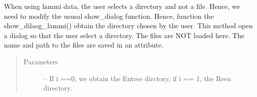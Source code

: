 \documentclass[letterpaper,10pt,english]{sphinxmanual}
\begin{document}
\begin{fulllineitems}
\begin{fulllineitems}
\label{\detokenize{index:src_GUI.hydro_GUI_2.LAMMI.show_dialog_lammi}}
When using lammi data, the user selects a directory and not a file. Hence, we need to modify the ususal
show\_dialog function. Hence, function the show\_dilaog\_lammi() obtain the directory chosen by the user.
This method open a dialog so that the user select a directory. The files are NOT loaded here. The name and path
to the files are saved in an attribute.
\begin{quote}\begin{description}
\item[{Parameters}] \leavevmode
{} -- If i ==0, we obtain the Entree dirctory, if i == 1, the Resu directory.

\end{description}\end{quote}

\end{fulllineitems}


\end{fulllineitems}

\end{document}
